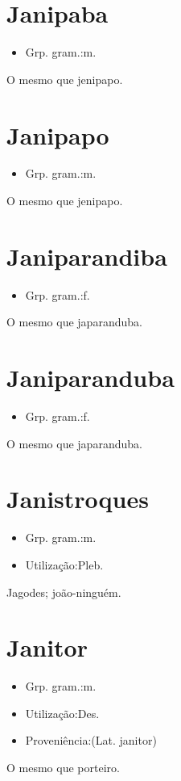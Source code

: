 \documentclass{article}
\begin{document}
\section{Janipaba}
\begin{itemize}
\item {Grp. gram.:m.}
\end{itemize}
O mesmo que \textunderscore jenipapo\textunderscore .
\section{Janipapo}
\begin{itemize}
\item {Grp. gram.:m.}
\end{itemize}
O mesmo que \textunderscore jenipapo\textunderscore .
\section{Janiparandiba}
\begin{itemize}
\item {Grp. gram.:f.}
\end{itemize}
O mesmo que \textunderscore japaranduba\textunderscore .
\section{Janiparanduba}
\begin{itemize}
\item {Grp. gram.:f.}
\end{itemize}
O mesmo que \textunderscore japaranduba\textunderscore .
\section{Janistroques}
\begin{itemize}
\item {Grp. gram.:m.}
\end{itemize}
\begin{itemize}
\item {Utilização:Pleb.}
\end{itemize}
Jagodes; joão-ninguém.
\section{Janitor}
\begin{itemize}
\item {Grp. gram.:m.}
\end{itemize}
\begin{itemize}
\item {Utilização:Des.}
\end{itemize}
\begin{itemize}
\item {Proveniência:(Lat. \textunderscore janitor\textunderscore )}
\end{itemize}
O mesmo que \textunderscore porteiro\textunderscore .
\end{document}
